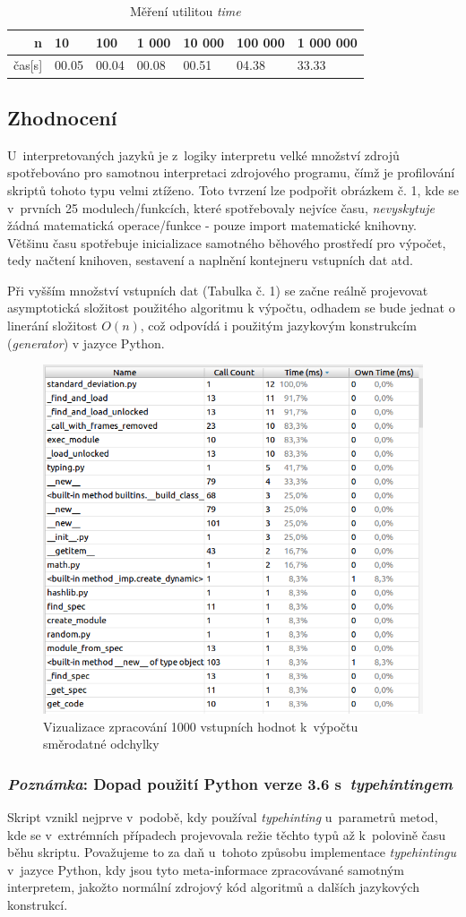 \documentclass[12pt,a4paper,titlepage]{extarticle}
\begin{document}
\begin{table}[H]
\centering
\begin{tabular}{r|llllll}
\hline
n       & 10    & 100   & 1 000 & 10 000    & 100 000   & 1 000 000  \\\hline
čas[s]  & 00.05 & 00.04 & 00.08 & 00.51     & 04.38     & 33.33      \\
\hline
\end{tabular}
\caption{Měření utilitou \emph{time}}
\end{table}

\subsection{Zhodnocení}
U~interpretovaných jazyků je z~logiky interpretu velké množství zdrojů spotřebováno pro samotnou interpretaci zdrojového programu,
čímž je profilování skriptů tohoto typu velmi ztíženo. Toto tvrzení lze podpořit obrázkem č. 1,
kde se v~prvních 25 modulech/funkcích, které spotřebovaly nejvíce času, \emph{nevyskytuje} žádná matematická operace/funkce -
pouze import matematické knihovny. Většinu času spotřebuje inicializace samotného běhového prostředí pro výpočet,
tedy načtení knihoven, sestavení a naplnění kontejneru vstupních dat atd.

Při vyšším množství vstupních dat (Tabulka č. 1) se začne reálně projevovat asymptotická složitost použitého algoritmu k výpočtu,
odhadem se bude jednat o linerání složitost $O(n)$, což odpovídá i použitým jazykovým konstrukcím (\emph{generator})
v jazyce Python.
\begin{figure}[H]
\centering
\includegraphics[width=.5\textwidth]{sd10-typehinting}
\caption{Vizualizace zpracování 1000 vstupních hodnot k~výpočtu směrodatné odchylky}
\end{figure}

\subsubsection{\emph{Poznámka}: Dopad použití Python verze 3.6 s~\textit{typehintingem}}
Skript  vznikl nejprve v~podobě, kdy používal \textit{typehinting} u~parametrů metod,
kde se v~extrémních případech projevovala režie těchto typů až k~polovině času běhu skriptu. Považujeme to za daň u~tohoto
způsobu implementace \textit{typehintingu} v~jazyce Python, kdy jsou tyto meta-informace zpracovávané samotným interpretem,
jakožto normální zdrojový kód algoritmů a dalších jazykových konstrukcí.
\end{document}
